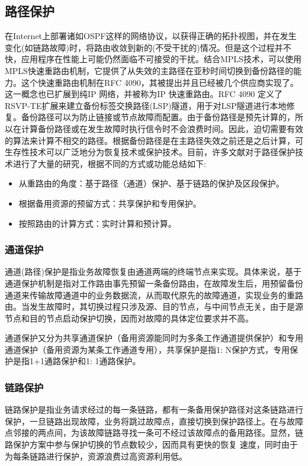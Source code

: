 \subsection{路径保护}
在Internet上部署诸如OSPF这样的网络协议，以获得正确的拓扑视图，并在发生变化(如链路故障)时，将路由收敛到新的(不受干扰的)情况。但是这个过程并不快，应用程序在性能上可能仍然面临不可接受的干扰。结合MPLS技术，可以使用MPLS快速重路由机制，它提供了从失效的主路径在亚秒时间切换到备份路径的能力。这个快速重路由机制在RFC 4090\cite{pan2005fast}，其被提出并且已经被几个供应商实现了。这一概念也已扩展到纯IP 网络，并被称为IP 快速重路由\cite{shand2010ip}。RFC 4090 定义了RSVP-TE扩展来建立备份标签交换路径(LSP)隧道，用于对LSP隧道进行本地修复。备份路径可以为防止链接或节点故障而配置。由于备份路径是预先计算的，所以在计算备份路径或在发生故障时执行信令时不会浪费时间。因此，迫切需要有效的算法来计算不相交的路径。根据备份路径是在主路径失效之前还是之后计算，可生存性技术可以广泛地分为恢复技术或保护技术。目前，许多文献对于路径保护技术进行了大量的研究，根据不同的方式或功能总结如下:
\begin{itemize}
\item 从重路由的角度：基于路径（通道）保护、基于链路的保护及区段保护。
\item 根据备用资源的预留方式：共享保护和专用保护。
\item 按照路由的计算方式：实时计算和预计算。
\end{itemize}
\subsubsection{通道保护}
通道(路径)保护是指业务故障恢复由通道两端的终端节点来实现。具体来说，基于通道保护机制是指对工作路由事先预留一条备份路由，在故障发生后，用预留备份通道来传输故障通道中的业务数据流，从而取代原先的故障通道，实现业务的重路由。当发生故障时，其切换过程只涉及源、目的节点，与中间节点无关，由于是源节点和目的节点启动保护切换，因而对故障的具体定位要求并不高。

通道保护又分为共享通道保护（备用资源能同时为多条工作通道提供保护）和专用通道保护（备用资源为某条工作通道专用），共享保护是指1: N保护方式，专用保护是指1+1通路保护和1: 1通路保护。
\subsubsection{链路保护}
链路保护是指业务请求经过的每一条链路，都有一条备用保护路径对这条链路进行保护，一旦链路出现故障，业务将跳过故障点，直接切换到保护路径上。在与故障点邻接的两点间，为该故障链路寻找一条可不经过该故障点的备用路径。显然，链路保护方案中参与保护切换的节点数较少，因而具有更快的恢复 速度，同时由于为每条链路进行保护，资源浪费过高资源利用低。

